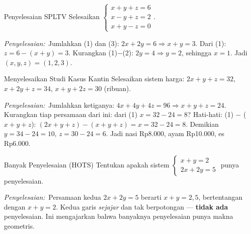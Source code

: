 \documentclass[11pt,a4paper]{report}
\theoremstyle{gaya}
\newcommand{\jawab}{\par\smallskip\noindent\textit{\textcolor{oranye}{Penyelesaian:}}\ }
\begin{document}
\begin{contoh}{Penyelesaian SPLTV}
Selesaikan $\begin{cases} x+y+z=6\\ x-y+z=2\\ x+y-z=0 \end{cases}$.

\jawab Jumlahkan (1) dan (3): $2x+2y = 6 \Rightarrow x+y=3$.
Dari (1): $z = 6-(x+y) = 3$. Kurangkan (1)$-$(2): $2y = 4 \Rightarrow y=2$, sehingga $x=1$.
Jadi $(x,y,z)=(1,2,3)$.
\end{contoh}

\begin{contoh}{Menyelesaikan Studi Kasus Kantin}
Selesaikan sistem harga: $2x+y+z=32$, $x+2y+z=34$, $x+y+2z=30$ (ribuan).

\jawab Jumlahkan ketiganya: $4x+4y+4z=96\Rightarrow x+y+z=24$. Kurangkan tiap persamaan dari ini: dari (1) $x=32-24=8$? Hati-hati: (1) $-$ ($x+y+z$): $(2x+y+z)-(x+y+z)=x=32-24=8$. Demikian $y=34-24=10$, $z=30-24=6$. Jadi nasi Rp8.000, ayam Rp10.000, es Rp6.000.
\end{contoh}

\begin{contoh}{Banyak Penyelesaian (HOTS)}
Tentukan apakah sistem $\begin{cases} x+y=2\\ 2x+2y=5\end{cases}$ punya penyelesaian.

\jawab Persamaan kedua $2x+2y=5$ berarti $x+y=2{,}5$, bertentangan dengan $x+y=2$. Kedua garis \emph{sejajar} dan tak berpotongan --- \textbf{tidak ada} penyelesaian. Ini mengajarkan bahwa banyaknya penyelesaian punya makna geometris.
\end{contoh}
\end{document}
